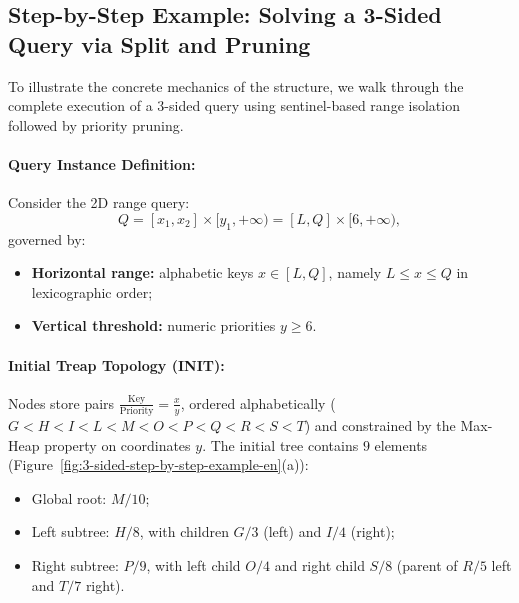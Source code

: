 \subsection{Step-by-Step Example: Solving a 3-Sided Query via Split and Pruning}
\label{sec:treap-3sided-example-en}

To illustrate the concrete mechanics of the structure, we walk through the complete execution of a 3-sided query using sentinel-based range isolation followed by priority pruning.

\paragraph{Query Instance Definition:}
Consider the 2D range query:
\begin{equation}
  Q = [x_1, x_2] \times [y_1, +\infty) = [L, Q] \times [6, +\infty),
\end{equation}
governed by:
\begin{itemize}
    \item \textbf{Horizontal range:} alphabetic keys $x \in [L, Q]$, namely $L \le x \le Q$ in lexicographic order;
    \item \textbf{Vertical threshold:} numeric priorities $y \ge 6$.
\end{itemize}

\paragraph{Initial Treap Topology (INIT):}
Nodes store pairs $\frac{\text{Key}}{\text{Priority}} = \frac{x}{y}$, ordered alphabetically ($G < H < I < L < M < O < P < Q < R < S < T$) and constrained by the Max-Heap property on coordinates $y$. The initial tree contains $9$ elements (Figure~\ref{fig:3-sided-step-by-step-example-en}(a)):
\begin{itemize}
    \item Global root: $M / 10$;
    \item Left subtree: $H / 8$, with children $G / 3$ (left) and $I / 4$ (right);
    \item Right subtree: $P / 9$, with left child $O / 4$ and right child $S / 8$ (parent of $R / 5$ left and $T / 7$ right).
\end{itemize}

